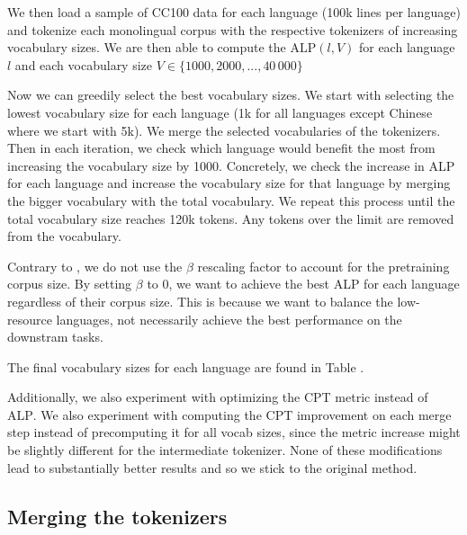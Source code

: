 We then load a sample of CC100 data for each language (100k lines per language) and tokenize each monolingual corpus with the respective tokenizers of increasing vocabulary sizes. We are then able to compute the $\mathrm{ALP}(l, V)$  for each language $l$ and each vocabulary size $V \in \{1000, 2000, ..., 40\,000\}$

Now we can greedily select the best vocabulary sizes. We start with selecting the lowest vocabulary size for each language (1k for all languages except Chinese where we start with 5k). We merge the selected vocabularies of the tokenizers. Then in each iteration, we check which language would benefit the most from increasing the vocabulary size by 1000. Concretely, we check the increase in ALP for each language and increase the vocabulary size for that language by merging the bigger vocabulary with the total vocabulary. We repeat this process until the total vocabulary size reaches 120k tokens. Any tokens over the limit are removed from the vocabulary.

Contrary to \citet{zheng_allocating_2021}, we do not use the $\beta$ rescaling factor to account for the pretraining corpus size. By setting $\beta$ to 0, we want to achieve the best ALP for each language regardless of their corpus size. This is because we want to balance the low-resource languages, not necessarily achieve the best performance on the downstram tasks.

The final vocabulary sizes for each language are found in Table .

Additionally, we also experiment with optimizing the \textsc{CPT} metric instead of \textsc{ALP}. We also experiment with computing the \textsc{CPT} improvement on each merge step instead of precomputing it for all vocab sizes, since the metric increase might be slightly different for the intermediate tokenizer. None of these modifications lead to substantially better results and so we stick to the original method. 

\subsection{Merging the tokenizers}



